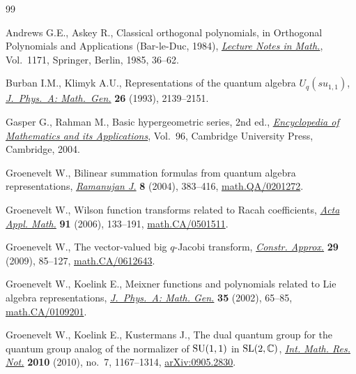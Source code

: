 \documentclass[pdftex]{sigma}
\numberwithin{equation}{section}
\numberwithin{theorem}{section}
\numberwithin{proposition}{section}
\numberwithin{lemma}{section}
\numberwithin{corollary}{section}
\numberwithin{definition}{section}
\numberwithin{example}{section}
\numberwithin{remark}{section}
\numberwithin{note}{section}
\begin{document}
\begin{thebibliography}{99}

\footnotesize\itemsep=0pt

Andrews G.E., Askey R.,
Classical orthogonal polynomials,
in Orthogonal Polynomials and Applications (Bar-le-Duc, 1984),
\href{http://dx.doi.org/10.1007/BFb0076530}{{\it Lecture Notes in Math.}}, Vol.~1171,  Springer, Berlin, 1985, 36--62.

Burban I.M., Klimyk A.U.,
Representations of the quantum algebra $U_q(su_{1,1})$,
\href{http://dx.doi.org/10.1088/0305-4470/26/9/011}{{\it J.~Phys.~A: Math.~Gen.}} \textbf{26} (1993), 2139--2151.

Gasper G., Rahman M.,
Basic hypergeometric series, 2nd ed.,
\href{http://dx.doi.org/10.1017/CBO9780511526251}{{\it Encyclopedia of Mathematics and its Applications}}, Vol.~96, Cambridge University Press, Cambridge, 2004.

Groenevelt W.,
Bilinear summation formulas from quantum algebra representations,
\href{http://dx.doi.org/10.1007/s11139-004-0145-1}{{\it Ramanujan J.}} \textbf{8} (2004), 383--416,
\href{http://arxiv.org/abs/math.QA/0201272}{math.QA/0201272}.

Groenevelt W.,
Wilson function transforms related to Racah coef\/f\/icients,
\href{http://dx.doi.org/10.1007/s10440-006-9024-7}{{\it Acta Appl. Math.}} \textbf{91} (2006),  133--191,
\href{http://arxiv.org/abs/math.CA/0501511}{math.CA/0501511}.

Groenevelt W.,
The vector-valued big $q$-Jacobi transform,
\href{http://dx.doi.org/10.1007/s00365-008-9009-z}{{\it Constr. Approx.}} \textbf{29} (2009), 85--127,
\href{http://arxiv.org/abs/math.CA/0612643}{math.CA/0612643}.

Groenevelt W., Koelink E.,
Meixner functions and polynomials related to Lie algebra representations,
\href{http://dx.doi.org/10.1088/0305-4470/35/1/306}{{\it J.~Phys.~A: Math. Gen.}} \textbf{35} (2002),   65--85,
\href{http://arxiv.org/abs/math.CA/0109201}{math.CA/0109201}.

Groenevelt W., Koelink E., Kustermans J.,
The dual quantum group for the quantum group analog of the normalizer of ${\rm SU}(1,1)$ in ${\rm SL}(2,\mathbb C)$,
\href{http://dx.doi.org/10.1093/imrn/rnp173}{{\it Int. Math. Res. Not.}} \textbf{2010} (2010), no.~7, 1167--1314,
\href{http://arxiv.org/abs/0905.2830}{arXiv:0905.2830}.


\end{thebibliography}
\end{document}

